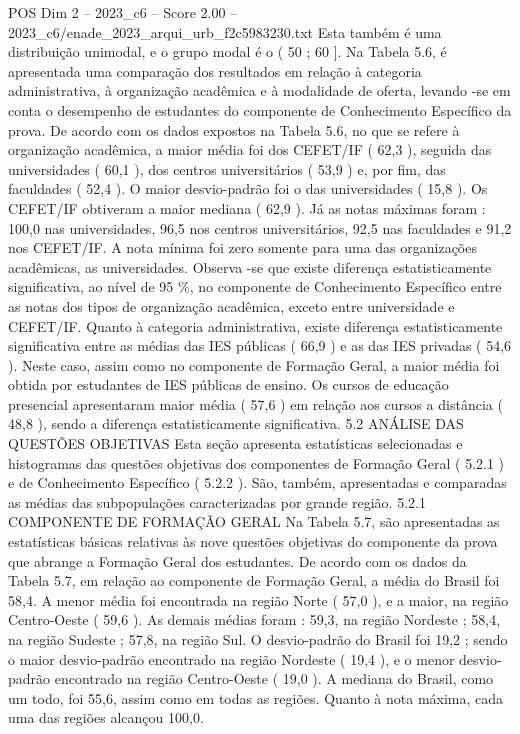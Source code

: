 \begin{textsample}{POS Dim 2 – 2023\_c6 – Score 2.00 – 2023\_c6/enade\_2023\_arqui\_urb\_f2c5983230.txt}
Esta também é uma distribuição unimodal, e o grupo modal é o ( 50 ; 60 ].
Na Tabela 5.6, é apresentada uma comparação dos resultados em relação à categoria administrativa, à organização acadêmica e à modalidade de oferta, levando -se em conta o desempenho de estudantes do componente de Conhecimento Específico da prova.
De acordo com os dados expostos na Tabela 5.6, no que se refere à organização acadêmica, a maior média foi dos CEFET/IF ( 62,3 ), seguida das universidades ( 60,1 ), dos centros universitários ( 53,9 ) e, por fim, das faculdades ( 52,4 ).
O maior desvio-padrão foi o das universidades ( 15,8 ).
Os CEFET/IF obtiveram a maior mediana ( 62,9 ).
Já as notas máximas foram : 100,0 nas universidades, 96,5 nos centros universitários, 92,5 nas faculdades e 91,2 nos CEFET/IF.
A nota mínima foi zero somente para uma das organizações acadêmicas, as universidades.
Observa -se que existe diferença estatisticamente significativa, ao nível de 95 \%, no componente de Conhecimento Específico entre as notas dos tipos de organização acadêmica, exceto entre universidade e CEFET/IF.
Quanto à categoria administrativa, existe diferença estatisticamente significativa entre as médias das IES públicas ( 66,9 ) e as das IES privadas ( 54,6 ).
Neste caso, assim como no componente de Formação Geral, a maior média foi obtida por estudantes de IES públicas de ensino.
Os cursos de educação presencial apresentaram maior média ( 57,6 ) em relação aos cursos a distância ( 48,8 ), sendo a diferença estatisticamente significativa. 5.2 ANÁLISE DAS QUESTÕES OBJETIVAS Esta seção apresenta estatísticas selecionadas e histogramas das questões objetivas dos componentes de Formação Geral ( 5.2.1 ) e de Conhecimento Específico ( 5.2.2 ).
São, também, apresentadas e comparadas as médias das subpopulações caracterizadas por grande região. 5.2.1 COMPONENTE DE FORMAÇÃO GERAL Na Tabela 5.7, são apresentadas as estatísticas básicas relativas às nove questões objetivas do componente da prova que abrange a Formação Geral dos estudantes.
De acordo com os dados da Tabela 5.7, em relação ao componente de Formação Geral, a média do Brasil foi 58,4.
A menor média foi encontrada na região Norte ( 57,0 ), e a maior, na região Centro-Oeste ( 59,6 ).
As demais médias foram : 59,3, na região Nordeste ; 58,4, na região Sudeste ; 57,8, na região Sul.
O desvio-padrão do Brasil foi 19,2 ; sendo o maior desvio-padrão encontrado na região Nordeste ( 19,4 ), e o menor desvio-padrão encontrado na região Centro-Oeste ( 19,0 ).
A mediana do Brasil, como um todo, foi 55,6, assim como em todas as regiões.
Quanto à nota máxima, cada uma das regiões alcançou 100,0.

\end{textsample}

